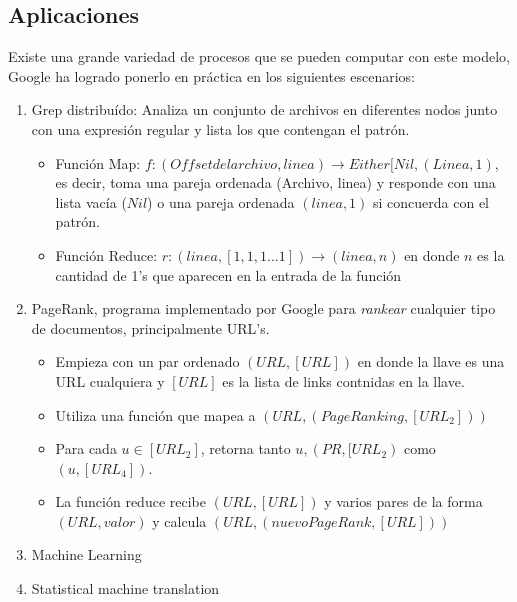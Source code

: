 \documentclass[spanish]{article}
\begin{document}
\subsection{Aplicaciones}
Existe una grande variedad de procesos que se pueden computar con este modelo, Google ha logrado ponerlo en práctica en los siguientes escenarios:
\begin{enumerate}
\item Grep distribuído: Analiza un conjunto de archivos en diferentes nodos junto con una expresión regular y lista los que contengan el patrón. \cite{GrepDistribuido}
  \begin{itemize}
    \item Función Map: $f: (Offset del archivo, linea) \rightarrow Either[Nil,(Linea,1)$, es decir, toma una pareja ordenada (Archivo, linea) y responde con una lista vacía ($Nil$) o una pareja ordenada $(linea,1)$ si concuerda con el patrón.
    \item Función Reduce: $r: (linea,[1,1,1...1]) \rightarrow (linea,n)$ en donde $n$ es la cantidad de 1's que aparecen en la entrada de la función
  \end{itemize}
  
  \item PageRank, programa implementado por Google para \textit{rankear} cualquier tipo de documentos, principalmente URL's. \cite{GrepDistribuido}
  \begin{itemize}
    \item Empieza con un par ordenado $(URL,[URL])$ en donde la llave es una URL cualquiera y $[URL]$ es la lista de links contnidas en la llave.
    \item Utiliza una función que mapea a $(URL,(PageRanking,[URL_2]))$
    \item Para cada $u \in [URL_2]$, retorna tanto $u,(PR,[URL_2)$ como $(u,[URL_4])$.
    \item La función reduce recibe $(URL,[URL])$ y varios pares de la forma $(URL,valor)$ y calcula $(URL,(nuevoPageRank,[URL]))$
  \end{itemize}

  \item Machine Learning
  \item Statistical machine translation
\end{enumerate}
\end{document}
